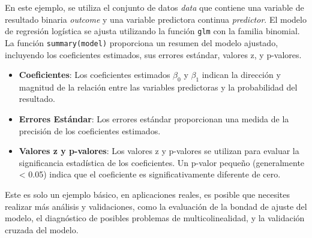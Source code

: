En este ejemplo, se utiliza el conjunto de datos \textit{data} que contiene una variable de resultado binaria \textit{outcome} y una variable predictora continua \textit{predictor}. El modelo de regresión logística se ajusta utilizando la función \texttt{glm} con la familia binomial. La función \texttt{summary(model)} proporciona un resumen del modelo ajustado, incluyendo los coeficientes estimados, sus errores estándar, valores z, y p-valores.

\begin{itemize}
    \item \textbf{Coeficientes}: Los coeficientes estimados $\beta_0$ y $\beta_1$ indican la dirección y magnitud de la relación entre las variables predictoras y la probabilidad del resultado.
    \item \textbf{Errores Estándar}: Los errores estándar proporcionan una medida de la precisión de los coeficientes estimados.
    \item \textbf{Valores z y p-valores}: Los valores z y p-valores se utilizan para evaluar la significancia estadística de los coeficientes. Un p-valor pequeño (generalmente < 0.05) indica que el coeficiente es significativamente diferente de cero.
\end{itemize}

Este es solo un ejemplo básico, en aplicaciones reales, es posible que necesites realizar más análisis y validaciones, como la evaluación de la bondad de ajuste del modelo, el diagnóstico de posibles problemas de multicolinealidad, y la validación cruzada del modelo.

